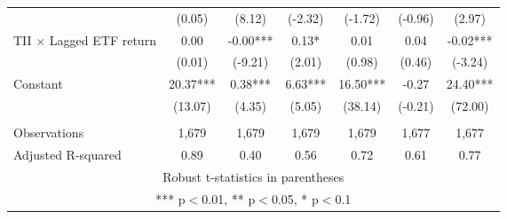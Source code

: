 \documentclass[]{article}
\begin{document}
\begin{tabular}{lcccccc}
 & (0.05) & (8.12) & (-2.32) & (-1.72) & (-0.96) & (2.97) \\
TII $\times$ Lagged ETF return & 0.00 & -0.00*** & 0.13* & 0.01 & 0.04 & -0.02*** \\
 & (0.01) & (-9.21) & (2.01) & (0.98) & (0.46) & (-3.24) \\
Constant & 20.37*** & 0.38*** & 6.63*** & 16.50*** & -0.27 & 24.40*** \\
 & (13.07) & (4.35) & (5.05) & (38.14) & (-0.21) & (72.00) \\
 &  &  &  &  &  &  \\
Observations & 1,679 & 1,679 & 1,679 & 1,679 & 1,677 & 1,677 \\
 Adjusted R-squared & 0.89 & 0.40 & 0.56 & 0.72 & 0.61 & 0.77 \\ \hline
\multicolumn{7}{c}{ Robust t-statistics in parentheses} \\
\multicolumn{7}{c}{ *** p$<$0.01, ** p$<$0.05, * p$<$0.1} \\
\end{tabular}
\end{document}
